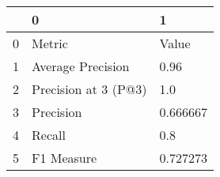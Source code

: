 \begin{tabular}{lll}
\toprule
{} &                     0 &         1 \\
\midrule
0 &                Metric &     Value \\
1 &     Average Precision &      0.96 \\
2 &  Precision at 3 (P@3) &       1.0 \\
3 &             Precision &  0.666667 \\
4 &                Recall &       0.8 \\
5 &            F1 Measure &  0.727273 \\
\bottomrule
\end{tabular}
